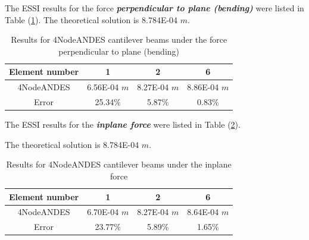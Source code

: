 \documentclass[fleqn,11pt]{article}
\begin{document}




The ESSI results for the force \textbf{\emph{perpendicular to plane (bending)}} were listed in Table (\ref{table 4NodeANDES cantilever beams results for different element number}). 
The theoretical solution is 8.784E-04 $m$.
\begin{table}[H]
  \centering
    \captionsetup{justification=centering,margin=2cm}
      \caption{Results for 4NodeANDES cantilever beams under the force perpendicular to plane (bending)}
    \label{table 4NodeANDES cantilever beams results for different element number}
    \begin{tabular}{|c|c|c|c|}
      \hline
      Element number & 1        & 2        & 6         \\  \hline
      4NodeANDES     & 6.56E-04 $m$ & 8.27E-04 $m$ & 8.86E-04 $m$     \\ \hline
      Error          & 25.34\% & 5.87\% & 0.83\%    \\ 
      \hline 
    \end{tabular}
\end{table}
The ESSI results for the \textbf{\emph{inplane force}} were listed in Table (\ref{table 4NodeANDES cantilever beams results for different element number 2}). 

The theoretical solution is 8.784E-04 $m$.


\begin{table}[H]
  \centering
      \captionsetup{justification=centering,margin=2cm}
      \caption{Results for 4NodeANDES cantilever beams under the inplane force}
    \label{table 4NodeANDES cantilever beams results for different element number 2}
    \begin{tabular}{|c|c|c|c|}
      \hline
      Element number & 1        & 2        & 6         \\  \hline
      4NodeANDES     &6.70E-04 $m$& 8.27E-04 $m$& 8.64E-04 $m$     \\ \hline
      Error          &  23.77\% & 5.89\% & 1.65\%          \\ 
      \hline 
    \end{tabular}
\end{table}
\end{document}
